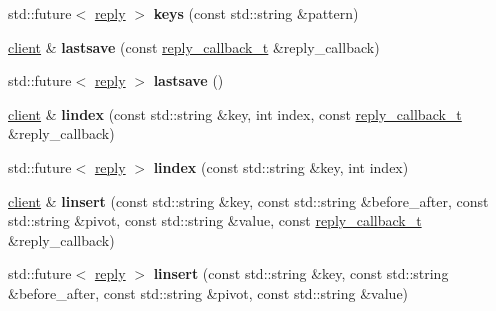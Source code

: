 \begin{DoxyCompactItemize}
\item 
\mbox{\label{classcpp__redis_1_1client_a1c0804cab9251acde742e725d0af6cbf}} 
std\+::future$<$ \hyperlink{classcpp__redis_1_1reply}{reply} $>$ {\bfseries keys} (const std\+::string \&pattern)
\item 
\mbox{\label{classcpp__redis_1_1client_a3b25eaf2691051156748abb69e1b0317}} 
\hyperlink{classcpp__redis_1_1client}{client} \& {\bfseries lastsave} (const \hyperlink{classcpp__redis_1_1client_a061a1140d36d2eaeda82b09a0bb3f9f2}{reply\+\_\+callback\+\_\+t} \&reply\+\_\+callback)
\item 
\mbox{\label{classcpp__redis_1_1client_a6b550a4ecf6eb33abffd664c3124b4f9}} 
std\+::future$<$ \hyperlink{classcpp__redis_1_1reply}{reply} $>$ {\bfseries lastsave} ()
\item 
\mbox{\label{classcpp__redis_1_1client_afa409d5b28466837137dfb12c3554070}} 
\hyperlink{classcpp__redis_1_1client}{client} \& {\bfseries lindex} (const std\+::string \&key, int index, const \hyperlink{classcpp__redis_1_1client_a061a1140d36d2eaeda82b09a0bb3f9f2}{reply\+\_\+callback\+\_\+t} \&reply\+\_\+callback)
\item 
\mbox{\label{classcpp__redis_1_1client_a58458ef30b1fb49584395b6f8584b931}} 
std\+::future$<$ \hyperlink{classcpp__redis_1_1reply}{reply} $>$ {\bfseries lindex} (const std\+::string \&key, int index)
\item 
\mbox{\label{classcpp__redis_1_1client_a80799f12e6aafe07872b2bbea453db53}} 
\hyperlink{classcpp__redis_1_1client}{client} \& {\bfseries linsert} (const std\+::string \&key, const std\+::string \&before\+\_\+after, const std\+::string \&pivot, const std\+::string \&value, const \hyperlink{classcpp__redis_1_1client_a061a1140d36d2eaeda82b09a0bb3f9f2}{reply\+\_\+callback\+\_\+t} \&reply\+\_\+callback)
\item 
\mbox{\label{classcpp__redis_1_1client_ab8d167d78e3c956fd1ade0e2f992f46a}} 
std\+::future$<$ \hyperlink{classcpp__redis_1_1reply}{reply} $>$ {\bfseries linsert} (const std\+::string \&key, const std\+::string \&before\+\_\+after, const std\+::string \&pivot, const std\+::string \&value)

\end{DoxyCompactItemize}
